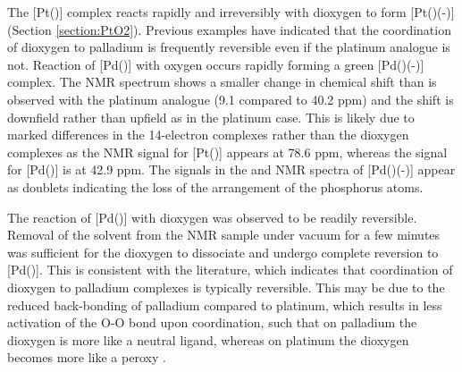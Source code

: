 The [Pt(\tButhixantphos)] complex reacts rapidly and irreversibly with dioxygen to form [Pt(\tButhixantphos)(-)] (Section \ref{section:PtO2}).  Previous examples have indicated that the coordination of dioxygen to palladium is frequently reversible even if the platinum analogue is not.\cite{Yoshida1979}  Reaction of [Pd(\tButhixantphos)] with oxygen occurs rapidly forming a green [Pd(\tButhixantphos)(-)] complex.  The \phosphorus{} NMR spectrum shows a smaller change in chemical shift than is observed with the platinum analogue (9.1 compared to 40.2 ppm) and the shift is downfield rather than upfield as in the platinum case.  This is likely due to marked differences in the 14-electron complexes rather than the dioxygen complexes as the \phosphorus{} NMR signal for [Pt(\tButhixantphos)] appears at 78.6 ppm, whereas the signal for [Pd(\tButhixantphos)] is at 42.9 ppm.  The \tBu{} signals in the \proton{} and \carbon{} NMR spectra of [Pd(\tButhixantphos)(-)] appear as doublets indicating the loss of the \trans{} arrangement of the phosphorus atoms.  

The reaction of [Pd(\tButhixantphos)] with dioxygen was observed to be readily reversible.  Removal of the solvent from the NMR sample under vacuum for a few minutes was sufficient for the dioxygen to dissociate and undergo complete reversion to [Pd(\tButhixantphos)].  This is consistent with the literature, which indicates that coordination of dioxygen to palladium complexes is typically reversible.\cite{Yoshida1979}  This may be due to the reduced back-bonding of palladium compared to platinum, which results in less activation of the O-O bond upon coordination, such that on palladium the dioxygen is more like a neutral  ligand, whereas on platinum the dioxygen becomes more like a peroxy .  

